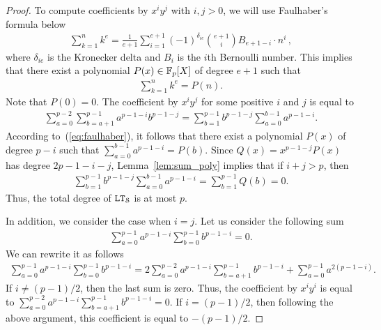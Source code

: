 \begin{proof}
    To compute coefficients by $x^i y^j$ with $i, j > 0$, we will use Faulhaber's formula below
    \begin{align*}
      \sum_{k=1}^n k^e = \frac{1}{e+1} \sum_{i=1}^{e+1} (-1)^{\delta_{ie}} \binom{e+1}{i} B_{e+1-i} \cdot n^i\,,
    \end{align*}
    where $\delta_{ie}$ is the Kronecker delta and $B_{i}$ is the $i$th Bernoulli number.
    This implies that there exist a polynomial $P(x) \in \mathbb{F}_p[X]$ of degree $e+1$ such that
    \begin{align}\label{eq:faulhaber}
      \sum_{k=1}^n k^e = P(n).
    \end{align}
    Note that $P(0) = 0$.
    The coefficient by $x^i y^j$ for some positive $i$ and $j$ is equal to
    \begin{align*}
      \sum_{a = 0}^{p-2} \sum_{b=a+1}^{p-1} a^{p-1-i} b^{p-1-j} = \sum_{b = 1}^{p-1} b^{p-1-j} \sum_{a=0}^{b-1} a^{p-1-i}.
    \end{align*}
    According to~(\ref{eq:faulhaber}), it follows that there exist a polynomial $P(x)$ of degree $p-i$ such that $\sum_{a=0}^{b-1} a^{p-1-i} = P(b)$.
    Since $Q(x) = x^{p-1-j} P(x)$ has degree $2p-1-i-j$, Lemma~\ref{lem:sum_poly} implies that if $i+j > p$, then
    \begin{align*}
      \sum_{b = 1}^{p-1} b^{p-1-j} \sum_{a=0}^{b-1} a^{p-1-i} = \sum_{b=1}^{p-1} Q(b) = 0.
    \end{align*}
    Thus, the total degree of $\mathtt{LT}_{\mathcal{S}}$ is at most $p$.

    In addition, we consider the case when $i = j$.
    Let us consider the following sum
    \begin{align*}
      \sum_{a=0}^{p-1} a^{p-1-i} \sum_{b=0}^{p-1} b^{p-1-i} = 0.
    \end{align*}
    We can rewrite it as follows
    \begin{align*}
      \sum_{a=0}^{p-1} a^{p-1-i} \sum_{b=0}^{p-1} b^{p-1-i} = 2\sum_{a=0}^{p-2} a^{p-1-i} \sum_{b=a+1}^{p-1} b^{p-1-i} + \sum_{a=0}^{p-1} a^{2(p-1-i)}.
    \end{align*}
    If $i \ne (p-1)/2$, then the last sum is zero.
    Thus, the coefficient by $x^i y^i$ is equal to $\sum_{a=0}^{p-2} a^{p-1-i} \sum_{b=a+1}^{p-1} b^{p-1-i} = 0$.
    If $i = (p-1)/2$, then following the above argument, this coefficient is equal to $-(p-1)/2$.
  \end{proof}

